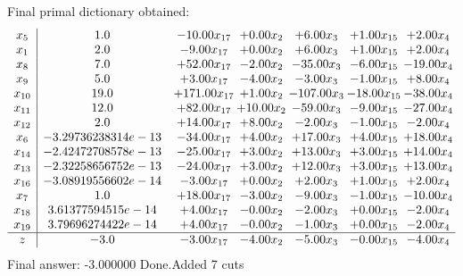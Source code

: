 \documentclass[8pt]{article}
\begin{document}
 Final primal dictionary obtained: 
\[\begin{array}{c| c c@{\hskip 2pt} c@{\hskip 2pt} c@{\hskip 2pt} c@{\hskip 2pt} c@{\hskip 2pt} }
 x_{5}   &  1.0 & -10.00 x_{17} & +  0.00 x_{2} & +  6.00 x_{3} & +  1.00 x_{15} & +  2.00 x_{4}\\
 x_{1}   &  2.0 & -9.00 x_{17} & +  0.00 x_{2} & +  6.00 x_{3} & +  1.00 x_{15} & +  2.00 x_{4}\\
 x_{8}   &  7.0 & + 52.00 x_{17} & -2.00 x_{2} & -35.00 x_{3} & -6.00 x_{15} & -19.00 x_{4}\\
 x_{9}   &  5.0 & +  3.00 x_{17} & -4.00 x_{2} & -3.00 x_{3} & -1.00 x_{15} & +  8.00 x_{4}\\
 x_{10}   &  19.0 & + 171.00 x_{17} & +  1.00 x_{2} & -107.00 x_{3} & -18.00 x_{15} & -38.00 x_{4}\\
 x_{11}   &  12.0 & + 82.00 x_{17} & + 10.00 x_{2} & -59.00 x_{3} & -9.00 x_{15} & -27.00 x_{4}\\
 x_{12}   &  2.0 & + 14.00 x_{17} & +  8.00 x_{2} & -2.00 x_{3} & -1.00 x_{15} & -2.00 x_{4}\\
 x_{6}   &  -3.29736238314e-13 & -34.00 x_{17} & +  4.00 x_{2} & + 17.00 x_{3} & +  4.00 x_{15} & + 18.00 x_{4}\\
 x_{14}   &  -2.42472708578e-13 & -25.00 x_{17} & +  3.00 x_{2} & + 13.00 x_{3} & +  3.00 x_{15} & + 14.00 x_{4}\\
 x_{13}   &  -2.32258656752e-13 & -24.00 x_{17} & +  3.00 x_{2} & + 12.00 x_{3} & +  3.00 x_{15} & + 13.00 x_{4}\\
 x_{16}   &  -3.08919556602e-14 & -3.00 x_{17} & +  0.00 x_{2} & +  2.00 x_{3} & +  1.00 x_{15} & +  2.00 x_{4}\\
 x_{7}   &  1.0 & + 18.00 x_{17} & -3.00 x_{2} & -9.00 x_{3} & -1.00 x_{15} & -10.00 x_{4}\\
 x_{18}   &  3.61377594515e-14 & +  4.00 x_{17} & -0.00 x_{2} & -2.00 x_{3} & +  0.00 x_{15} & -2.00 x_{4}\\
 x_{19}   &  3.79696274422e-14 & +  4.00 x_{17} & -0.00 x_{2} & -1.00 x_{3} & +  0.00 x_{15} & -2.00 x_{4}\\
\hline
z    &  -3.0 & -3.00 x_{17} & -4.00 x_{2} & -5.00 x_{3} & -0.00 x_{15} & -4.00 x_{4}\\
\end{array}\]
 Final answer: -3.000000 
Done.Added 7 cuts 
\end{document}
